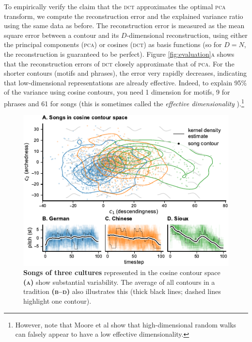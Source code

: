 \documentclass{article}
\newcommand{\subfiglabel}[1]{\textbf{\textsc{#1}}}
\begin{document}
To empirically verify the claim that the \textsc{dct} approximates the optimal \textsc{pca} transform, we compute the reconstruction error and the explained variance ratio using the same data as before.
The reconstruction error is measured as the mean square error between a contour and its $D$-dimensional reconstruction, using either the principal components (\textsc{pca}) or cosines (\textsc{dct}) as basis functions (so for $D=N$, the reconstruction is guaranteed to be perfect).
Figure \ref{fig:evaluation}\textsc{a} shows that the reconstruction errors of \textsc{dct} closely approximate that of \textsc{pca}.
For the shorter contours (motifs and phrases), the error very rapidly decreases, indicating that low-dimensional representations are already effective.
Indeed, to explain 95\% of the variance using cosine contours, you need 1 dimension for motifs, 9 for phrases and 61 for songs (this is sometimes called the \emph{effective dimensionality} \cite{Moore2018}).\footnote{%
    However, note that Moore et al \cite{Moore2018} show that high-dimensional random walks can falsely appear to have a low effective dimensionality.%
    }


\begin{figure}[t]
    \centering
    \includegraphics{figs/fig04-songs.pdf}
    \caption{
        \textbf{Songs of three cultures} represented in the cosine contour space \subfiglabel{(a)} show substantial variability.
        The average of all contours in a tradition \subfiglabel{(b--d)} also illustrates this
        (thick black lines; dashed lines highlight one contour).
        }
    \label{fig:songs}
\end{figure}
\end{document}
